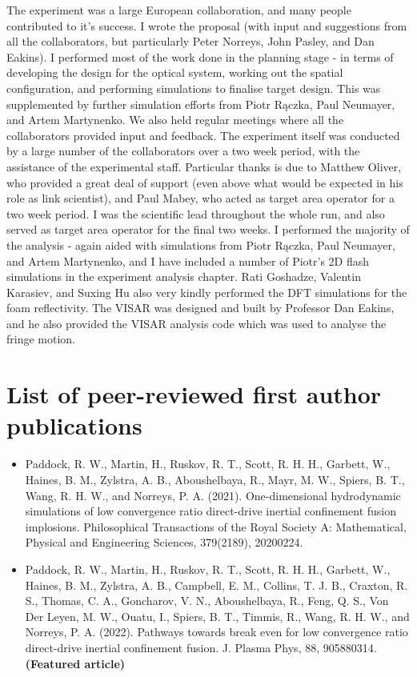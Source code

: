 The experiment was a large European collaboration, and many people contributed to it's success. I wrote the proposal (with input and suggestions from all the collaborators, but particularly Peter Norreys, John Pasley, and Dan Eakins). I performed most of the work done in the planning stage - in terms of developing the design for the optical system, working out the spatial configuration, and performing simulations to finalise target design. This was supplemented by further simulation efforts from Piotr R\k{a}czka, Paul Neumayer, and Artem Martynenko. We also held regular meetings where all the collaborators provided input and feedback. The experiment itself was conducted by a large number of the collaborators over a two week period, with the assistance of the experimental staff. Particular thanks is due to Matthew Oliver, who provided a great deal of support (even above what would be expected in his role as link scientist), and Paul Mabey, who acted as target area operator for a two week period. I was the scientific lead throughout the whole run, and also served as target area operator for the final two weeks. I performed the majority of the analysis - again aided with simulations from Piotr R\k{a}czka, Paul Neumayer, and Artem Martynenko, and I have included a number of Piotr's 2D flash simulations in the experiment analysis chapter. Rati Goshadze, Valentin  Karasiev, and Suxing Hu also very kindly performed the DFT simulations for the foam reflectivity. The VISAR was designed and built by Professor Dan Eakins, and he also provided the VISAR analysis code which was used to analyse the fringe motion.

\section{List of peer-reviewed first author publications}

\begin{itemize}
	\item Paddock, R. W., Martin, H., Ruskov, R. T., Scott, R. H. H., Garbett, W., Haines, B. M., Zylstra, A. B., Aboushelbaya, R., Mayr, M. W., Spiers, B. T., Wang, R. H. W., and Norreys, P. A. (2021). One-dimensional hydrodynamic simulations of low convergence ratio direct-drive inertial confinement fusion implosions. Philosophical Transactions of the Royal Society A: Mathematical, Physical and Engineering Sciences, 379(2189), 20200224.
	\item Paddock, R. W., Martin, H., Ruskov, R. T., Scott, R. H. H., Garbett, W., Haines, B. M., Zylstra, A. B., Campbell, E. M., Collins, T. J. B., Craxton, R. S., Thomas, C. A., Goncharov, V. N., Aboushelbaya, R., Feng, Q. S., Von Der Leyen, M. W., Ouatu, I., Spiers, B. T., Timmis, R., Wang, R. H. W., and Norreys, P. A. (2022). Pathways towards break even for low convergence ratio direct-drive inertial confinement fusion. J. Plasma Phys, 88, 905880314. \textbf{(Featured article)}
\end{itemize}

